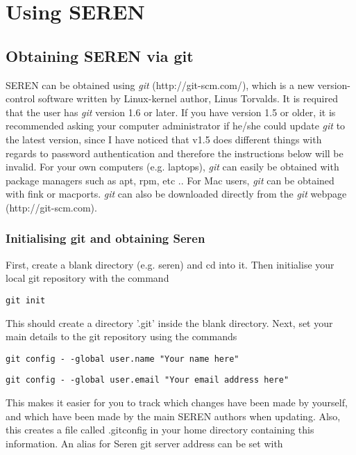\documentclass[a4paper]{article}
\newcommand{\NAME}{SEREN }
\newcommand{\var}[1]{\texttt{#1}}
\begin{document}
\newpage


\section{Using \NAME }


\subsection{Obtaining \NAME via git}
\NAME can be obtained using {\it git} ({\rm http://git-scm.com/}), which is a new version-control software written by Linux-kernel author, Linus Torvalds.  
It is required that the user has {\it git} version 1.6 or later.  If you have version 1.5 or older, it is recommended asking your computer administrator if he/she could update {\it git} to the latest version, since I have noticed that v1.5 does different things with regards to password authentication and therefore the instructions below will be invalid.  For your own computers (e.g. laptops), {\it git} can easily be obtained with package managers such as apt, rpm, etc ..   For Mac users, {\it git} can be obtained with fink or macports.  {\it git} can also be downloaded directly from the {\it git} webpage (http://git-scm.com).


\subsubsection{Initialising git and obtaining Seren}
First, create a blank directory (e.g. seren) and cd into it.  Then 
initialise your local git repository with the command \newline

\var{git init} \newline

\noindent This should create a directory '.git' inside the blank directory.  Next, set your main details to the git repository using 
the commands \newline

\var{git config -\,-global user.name "Your name here"} %

\var{git config -\,-global user.email "Your email address here"} \newline

\noindent This makes it easier for you to track which changes have been made by yourself, and which have been made by the main \NAME authors when updating.  Also, this creates a file called .gitconfig in your home directory containing this information.  An alias for Seren git server address can be set with \newline
\end{document}
